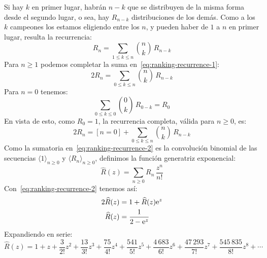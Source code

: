   Si hay \(k\) en primer lugar,
  habrán \(n - k\) que se distribuyen de la misma forma
  desde el segundo lugar,
  o sea,
  hay \(R_{n - k}\) distribuciones de los demás.
  Como a los \(k\) campeones los estamos eligiendo entre los \(n\),
  y pueden haber de \(1\) a \(n\) en primer lugar,
  resulta la recurrencia:%
  \begin{equation}
    \label{eq:ranking-recurrence-1}
    R_n
      = \sum_{ 1 \le k \le n} \binom{n}{k} \, R_{n - k}
  \end{equation}
  Para \(n \ge 1\)
  podemos completar la suma en~\eqref{eq:ranking-recurrence-1}:
  \begin{equation*}
    2 R_n
      = \sum_{0 \le k \le n} \binom{n}{k} \, R_{n - k}
  \end{equation*}
  Para \(n = 0\) tenemos:
  \begin{equation*}
    \sum_{0 \le k \le 0} \binom{0}{k} \, R_{0 - k}
      = R_0
  \end{equation*}
  En vista de esto,
  como \(R_0 = 1\),
  la recurrencia completa,
  válida para \(n \ge 0\),
  es:
  \begin{equation}
    \label{eq:ranking-recurrence-2}
    2 R_n
      = [n = 0] + \sum_{0 \le k \le n} \binom{n}{k} \, R_{n - k}
  \end{equation}
  Como la sumatoria en~\eqref{eq:ranking-recurrence-2}
  es la convolución binomial
  de las secuencias \(\langle 1 \rangle_{n \ge 0}\)
  y \(\langle R_n \rangle_{n \ge 0}\),
  definimos la función generatriz exponencial:%
  \begin{equation}
    \label{eq:ranking-gf-def}
    \widehat{R}(z)
       = \sum_{n \ge 0} R_n \, \frac{z^n}{n!}
  \end{equation}
  Con~\eqref{eq:ranking-recurrence-2} tenemos así:
  \begin{align}
    2 \widehat{R}(z)
      &= 1 + \widehat{R}(z) \mathrm{e}^z \notag \\
    \widehat{R}(z)
      &= \frac{1}{2 - \mathrm{e}^z}
	    \label{eq:ranking-gf}
  \end{align}
  Expandiendo en serie:
  \begin{equation*}
    \widehat{R}(z)
      = 1 + z + \frac{3}{2!} z^2 + \frac{13}{3!} z^3
	  + \frac{75}{4!} z^4 + \frac{541}{5!} z^5
	  + \frac{4\,683}{6!} z^6 + \frac{47\,293}{7!} z^7
	  + \frac{545\,835}{8!} z^8
	  + \dotsb
  \end{equation*}

